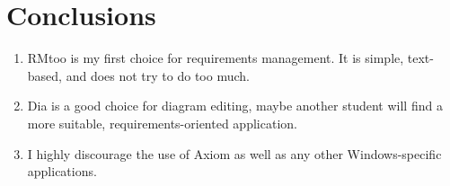 \documentclass[12pt]{article}
\begin{document}
\section{Conclusions}
\begin{enumerate}
\item RMtoo is my first choice for requirements management. It is
  simple, text-based, and does not try to do too much.
\item Dia is a good choice for diagram editing, maybe another student
  will find a more suitable, requirements-oriented application.
\item I highly discourage the use of Axiom as well as any other
  Windows-specific applications. 
\end{enumerate}
\end{document}
